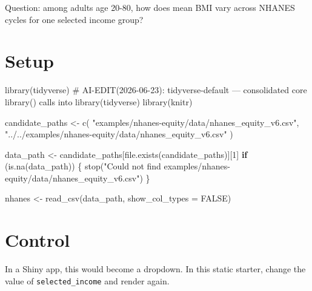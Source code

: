 \documentclass[
  letterpaper,
  DIV=11,
  numbers=noendperiod,
  oneside]{scrreprt}
\newenvironment{Shaded}{\begin{snugshade}}{\end{snugshade}}
\newcommand{\AttributeTok}[1]{\textcolor[rgb]{0.40,0.45,0.13}{#1}}
\newcommand{\CommentTok}[1]{\textcolor[rgb]{0.37,0.37,0.37}{#1}}
\newcommand{\ConstantTok}[1]{\textcolor[rgb]{0.56,0.35,0.01}{#1}}
\newcommand{\ControlFlowTok}[1]{\textcolor[rgb]{0.00,0.23,0.31}{\textbf{#1}}}
\newcommand{\DecValTok}[1]{\textcolor[rgb]{0.68,0.00,0.00}{#1}}
\newcommand{\FunctionTok}[1]{\textcolor[rgb]{0.28,0.35,0.67}{#1}}
\newcommand{\NormalTok}[1]{\textcolor[rgb]{0.00,0.23,0.31}{#1}}
\newcommand{\OtherTok}[1]{\textcolor[rgb]{0.00,0.23,0.31}{#1}}
\newcommand{\StringTok}[1]{\textcolor[rgb]{0.13,0.47,0.30}{#1}}
\begin{document}
Question: among adults age 20-80, how does mean BMI vary across NHANES
cycles for one selected income group?

\section*{Setup}\label{setup-1}


\begin{Shaded}
\begin{Highlighting}[numbers=left,,]
\FunctionTok{library}\NormalTok{(tidyverse)  }\CommentTok{\# AI{-}EDIT(2026{-}06{-}23): tidyverse{-}default — consolidated core library() calls into library(tidyverse)}
\FunctionTok{library}\NormalTok{(knitr)}

\NormalTok{candidate\_paths }\OtherTok{\textless{}{-}} \FunctionTok{c}\NormalTok{(}
  \StringTok{"examples/nhanes{-}equity/data/nhanes\_equity\_v6.csv"}\NormalTok{,}
  \StringTok{"../../examples/nhanes{-}equity/data/nhanes\_equity\_v6.csv"}
\NormalTok{)}

\NormalTok{data\_path }\OtherTok{\textless{}{-}}\NormalTok{ candidate\_paths[}\FunctionTok{file.exists}\NormalTok{(candidate\_paths)][}\DecValTok{1}\NormalTok{]}
\ControlFlowTok{if}\NormalTok{ (}\FunctionTok{is.na}\NormalTok{(data\_path)) \{}
  \FunctionTok{stop}\NormalTok{(}\StringTok{"Could not find examples/nhanes{-}equity/data/nhanes\_equity\_v6.csv"}\NormalTok{)}
\NormalTok{\}}

\NormalTok{nhanes }\OtherTok{\textless{}{-}} \FunctionTok{read\_csv}\NormalTok{(data\_path, }\AttributeTok{show\_col\_types =} \ConstantTok{FALSE}\NormalTok{)}
\end{Highlighting}
\end{Shaded}

\section*{Control}\label{control-1}


In a Shiny app, this would become a dropdown. In this static starter,
change the value of \texttt{selected\_income} and render again.
\end{document}
